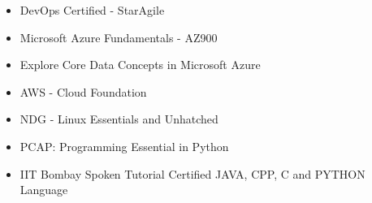 \documentclass[9pt]{developercv} %
\begin{document}
\vspace{-10 pt}
    \vspace{-15pt}
        \begin{multicols}{2}
		\begin{itemize}[noitemsep,topsep=0pt,parsep=0pt,partopsep=0pt, leftmargin=2.8cm]
			 \item DevOps Certified - StarAgile 
			 \item Microsoft Azure Fundamentals - AZ900
			 \item Explore Core Data Concepts in Microsoft Azure
			 \item AWS - Cloud Foundation
			 \item NDG - Linux Essentials and Unhatched
			 \item PCAP: Programming Essential in Python
			 \item IIT Bombay Spoken Tutorial Certified JAVA, CPP, C and PYTHON Language
		\end{itemize}
	\end{multicols}

\end{document}
